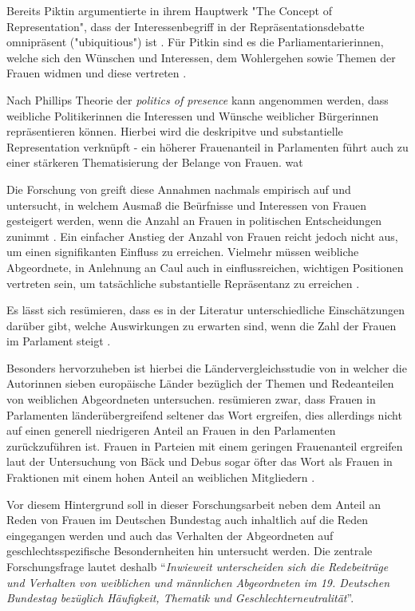 \documentclass[12pt, 
    twoside=false, 
    bibliography=totoc, 
    numbers=endperiod, 
    headings=normal, 
    toc=chapterentrydotfill
    ]{scrbook}
\begin{document}
Bereits Piktin \parencite*{pitkin_1972} argumentierte in ihrem Hauptwerk "The Concept of Representation", dass der Interessenbegriff in der Repräsentationsdebatte omnipräsent ("ubiquitious") ist \parencite[69]{wangnerud_2000}. Für Pitkin sind es die Parliamentarierinnen, welche sich den Wünschen und Interessen, dem Wohlergehen sowie Themen der Frauen widmen und diese vertreten \parencites[vgl.][413]{blaxill_2016}{pitkin_1972}. 

Nach Phillips Theorie der \emph{politics of presence} \parencite*{phillips_1998} kann angenommen werden, dass weibliche Politikerinnen die Interessen und Wünsche weiblicher Bürger\*innen repräsentieren können. Hierbei wird die deskripitve und substantielle Representation verknüpft \parencite[52]{wangnerud_2009} - ein höherer Frauenanteil in Parlamenten führt auch zu einer stärkeren Thematisierung der Belange von Frauen. wat

Die Forschung von \textcite{celis_2008} greift diese Annahmen nachmals empirisch auf und untersucht, in welchem Ausmaß die Beürfnisse und Interessen von Frauen gesteigert werden, wenn die Anzahl an Frauen in politischen Entscheidungen zunimmt \parencite[vgl. auch][4]{galligan_2016}. Ein einfacher Anstieg der Anzahl von Frauen reicht jedoch nicht aus, um einen signifikanten Einfluss zu erreichen. Vielmehr müssen weibliche Abgeordnete, in Anlehnung an Caul \parencite*{caul_2001} auch in einflussreichen, wichtigen Positionen vertreten sein, um tatsächliche substantielle Repräsentanz zu erreichen \parencites{caul_2001}[vgl. auch][14]{coffe_2013}.

Es lässt sich resümieren, dass es in der Literatur unterschiedliche Einschätzungen darüber gibt, welche Auswirkungen zu erwarten sind, wenn die Zahl der Frauen im Parlament steigt \parencite{wangnerud_2009}. 

Besonders hervorzuheben ist hierbei die Ländervergleichsstudie von \textcite{back_2018} in welcher die Autor\*innen sieben europäische Länder bezüglich der Themen und Redeanteilen von weiblichen Abgeordneten untersuchen. 
\textcite{back_2018} resümieren zwar, dass Frauen in Parlamenten länderübergreifend seltener das Wort ergreifen, dies allerdings nicht auf einen generell niedrigeren Anteil an Frauen in den Parlamenten zurückzuführen ist. Frauen in Parteien mit einem geringen Frauenanteil ergreifen laut der Untersuchung von Bäck und Debus sogar öfter das Wort als Frauen in Fraktionen mit einem hohen Anteil an weiblichen Mitgliedern \parencite[17]{back_2018}. 

Vor diesem Hintergrund soll in dieser Forschungsarbeit neben dem Anteil an Reden von Frauen im Deutschen Bundestag auch inhaltlich auf die Reden eingegangen werden und auch das Verhalten der Abgeordneten auf geschlechtsspezifische Besondernheiten hin untersucht werden. Die zentrale Forschungsfrage lautet deshalb \enquote{\emph{Inwieweit unterscheiden sich die Redebeiträge und Verhalten von weiblichen und männlichen Abgeordneten im 19. Deutschen Bundestag bezüglich Häufigkeit, Thematik und Geschlechterneutralität}}.
\end{document}
